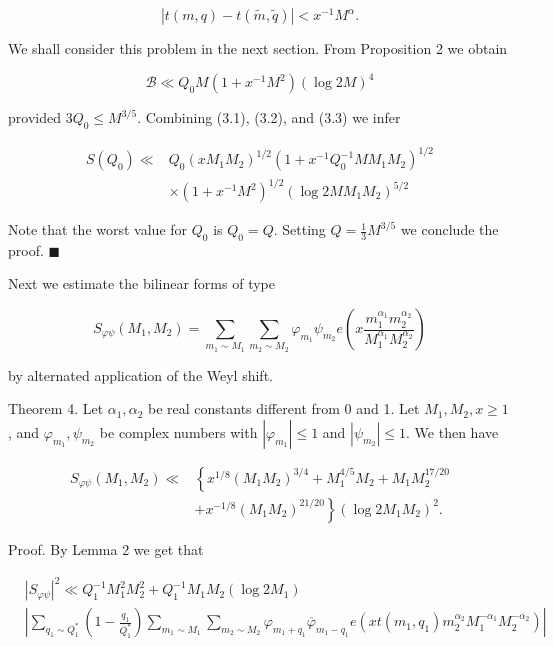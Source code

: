 \documentclass[10pt]{article}
\newcommand{\proofend}{\hfill\(\blacksquare\)}
\begin{document}
$$
|t(m, q)-t(\tilde{m}, \tilde{q})|<x^{-1} M^{\alpha} .
$$

We shall consider this problem in the next section. From Proposition 2 we obtain


\begin{equation*}
\mathscr{B} \ll Q_{0} M\left(1+x^{-1} M^{2}\right)(\log 2 M)^{4} \tag{3.3}
\end{equation*}


provided $3 Q_{0} \leqslant M^{3 / 5}$. Combining (3.1), (3.2), and (3.3) we infer

$$
\begin{aligned}
S\left(Q_{0}\right) \ll & Q_{0}\left(x M_{1} M_{2}\right)^{1 / 2}\left(1+x^{-1} Q_{0}^{-1} M M_{1} M_{2}\right)^{1 / 2} \\
& \times\left(1+x^{-1} M^{2}\right)^{1 / 2}\left(\log 2 M M_{1} M_{2}\right)^{5 / 2}
\end{aligned}
$$

Note that the worst value for $Q_{0}$ is $Q_{0}=Q$. Setting $Q=\frac{1}{3}M^{3/5}$ we conclude the proof. \proofend

Next we estimate the bilinear forms of type

$$
S_{\varphi\psi}\left(M_{1}, M_{2}\right)=\sum_{m_{1} \sim M_{1}} \sum_{m_{2} \sim M_{2}} \varphi_{m_{1}} \psi_{m_{2}} e\left(x \frac{m_{1}^{\alpha_{1}} m_{2}^{\alpha_{2}}}{M_{1}^{\alpha_{1}} M_{2}^{\alpha_{2}}}\right)
$$

by alternated application of the Weyl shift.

Theorem 4. Let $\alpha_{1}, \alpha_{2}$ be real constants different from 0 and 1. Let $M_{1}, M_{2}, x \geqslant 1$, and $\varphi_{m_{1}}, \psi_{m_{2}}$ be complex numbers with $\left|\varphi_{m_{1}}\right| \leqslant 1$ and $\left|\psi_{m_{2}}\right| \leqslant 1$. We then have

$$
\begin{aligned}
S_{\varphi\psi}\left(M_{1}, M_{2}\right)\ll & \left\{x^{1 / 8}\left(M_{1} M_{2}\right)^{3 / 4}+M_{1}^{4 / 5} M_{2}+M_{1} M_{2}^{17 / 20}\right. \\
& \left.+x^{-1 / 8}\left(M_{1} M_{2}\right)^{21 / 20}\right\}\left(\log 2 M_{1} M_{2}\right)^{2} .
\end{aligned}
$$

Proof. By Lemma 2 we get that

$$
\begin{aligned}
& \left|S_{\varphi\psi}\right|^{2} \ll Q_{1}^{-1} M_{1}^{2} M_{2}^{2}+Q_{1}^{-1} M_{1} M_{2}\left(\log 2 M_{1}\right) \\
& \left|\sum_{q_{1} \sim Q_{1}^{*}}\left(1-\frac{q_{1}}{Q_{1}^{*}}\right) \sum_{m_{1} \sim M_{1}} \sum_{m_{2} \sim M_{2}} \varphi_{m_{1}+q_{1}}\overline{\varphi}_{m_{1}-q_{1}} e\left(x t\left(m_{1}, q_{1}\right) m_{2}^{\alpha_{2}} M_{1}^{-\alpha_{1}} M_{2}^{-\alpha_{2}}\right)\right|
\end{aligned}
$$
\end{document}
